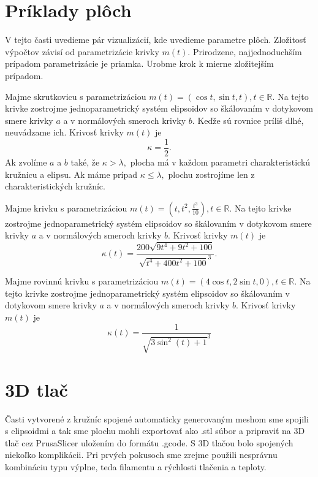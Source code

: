 \section{Príklady plôch}
V tejto časti uvedieme pár vizualizácií, kde uvedieme parametre plôch. Zložitosť výpočtov závisí od parametrizácie krivky $m(t).$ Prirodzene, najjednoduchším prípadom parametrizácie je priamka. Urobme krok k mierne zložitejším prípadom.
\begin{example}[Skrutkovica]
Majme skrutkovicu s parametrizáciou $m(t)=(\cos t, \sin t, t), t \in \mathbb{R}.$ Na tejto krivke zostrojme jednoparametrický systém elipsoidov so škálovaním v dotykovom smere krivky $a$ a v normálových smeroch krivky $b$. Keďže sú rovnice príliš dlhé, neuvádzame ich. 
Krivosť krivky $m(t)$ je
$$
\kappa = \frac{1}{2}.
$$
Ak zvolíme $a$ a $b$ také, že $\kappa > \lambda, $ plocha má v každom parametri charakteristickú kružnicu a elipsu.
Ak máme prípad $\kappa \leq \lambda,$ plochu zostrojíme len z charakteristických kružníc. 
\end{example}

\begin{example}[Bienert]
Majme krivku s parametrizáciou $m(t)=(t, t^2, \frac{t^3}{10}), t \in \mathbb{R}.$ Na tejto krivke zostrojme jednoparametrický systém elipsoidov so škálovaním v dotykovom smere krivky $a$ a v normálových smeroch krivky $b$.
Krivosť krivky $m(t)$ je
$$
\kappa(t) = \frac{200 \sqrt{9 t^{4} + 9 t^{2} + 100}}{\sqrt{ t^{4} + 400 t^{2} + 100}^3}.
$$
\end{example}

\begin{example}[Srdce]
Majme rovinnú krivku s parametrizáciou $m(t)=(4 \cos t, 2 \sin t, 0), t \in \mathbb{R}.$ Na tejto krivke zostrojme jednoparametrický systém elipsoidov so škálovaním v dotykovom smere krivky $a$ a v normálových smeroch krivky $b$.
Krivosť krivky $m(t)$ je
$$
\kappa(t) = \frac{1}{\sqrt{3 \sin^{2}{\left(t \right)} + 1}^{3}}
$$
\end{example}

\section{3D tlač}
Časti vytvorené z kružníc spojené automaticky generovaným meshom sme spojili s elipsoidmi a tak sme plochu mohli exportovať ako .stl súbor a pripraviť na 3D tlač cez PrusaSlicer uložením do formátu .gcode. S 3D tlačou bolo spojených niekoľko komplikácii. Pri prvých pokusoch sme zrejme použili nesprávnu kombináciu typu výplne, teda filamentu a rýchlosti tlačenia a teploty. 

